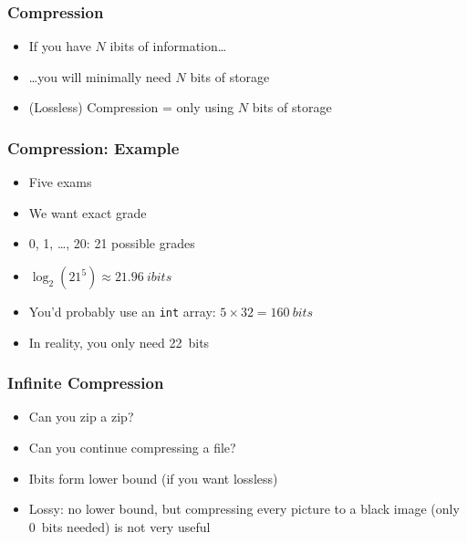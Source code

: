 \documentclass{../ucll-slides}
\begin{document}
\begin{frame}
  \frametitle{Compression}
  \begin{itemize}
    \item If you have $N$ ibits of information\dots
    \item \dots you will minimally need $N$ bits of storage
    \item (Lossless) Compression = only using $N$ bits of storage
  \end{itemize}
\end{frame}

\begin{frame}
  \frametitle{Compression: Example}
  \begin{itemize}
    \item Five exams
    \item We want exact grade
    \item 0, 1, \dots, 20: 21 possible grades
    \item $\log_2(21^5) \approx \SI{21.96}{ibits}$
    \item You'd probably use an {\tt int} array: $5 \times 32 = \SI{160}{bits}$
    \item In reality, you only need \SI{22}{bits}
  \end{itemize}
\end{frame}

\begin{frame}
  \frametitle{Infinite Compression}
  \begin{itemize}
    \item Can you zip a zip?
    \item Can you continue compressing a file?
    \item Ibits form lower bound (if you want lossless)
    \item Lossy: no lower bound, but compressing every picture to a black image (only \SI{0}{bits} needed) is not very useful
  \end{itemize}
\end{frame}
\end{document}
